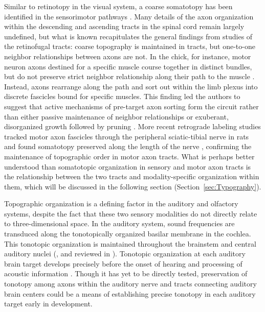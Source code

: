Similar to retinotopy in the visual system, a coarse somatotopy has been identified in the sensorimotor pathways \cite{barnard1956study,maslany1991somatotopic,milner1998selective}.
Many details of the axon organization within the descending and ascending tracts in the spinal cord remain largely undefined, but what is known recapitulates the general findings from studies of the retinofugal tracts: coarse topography is maintained in tracts, but one-to-one neighbor relationships between axons are not.
In the chick, for instance, motor neuron axons destined for a specific muscle course together in distinct bundles, but do not preserve strict neighbor relationship along their path to the muscle \cite{lance1981pathway}. 
Instead, axons rearrange along the path and sort out within the limb plexus into discrete fascicles bound for specific muscles. 
This finding led the authors to suggest that active mechanisms of pre-target axon sorting form the circuit rather than either passive maintenance of neighbor relationships or exuberant, disorganized growth followed by pruning \cite{lance1981pathway}. %
More recent retrograde labeling studies tracked motor axon fascicles through the peripheral sciatic-tibial nerve in rats and found somatotopy preserved along the length of the nerve \cite{badia2010topographical}, confirming the maintenance of topographic order in motor axon tracts. 
What is perhaps better understood than somatotopic organization in sensory and motor axon tracts is the relationship between the two tracts and modality-specific organization within them, which will be discussed in the following section (Section~\ref{sec:Typography}).

Topographic organization is a defining factor in the auditory and olfactory systems, despite the fact that these two sensory modalities do not directly relate to three-dimensional space.
In the auditory system, sound frequencies are transduced along the tonotopically organized basilar membrane in the cochlea.
This tonotopic organization is maintained throughout the brainstem and central auditory nuclei (, and reviewed in ).
Tonotopic organization at each auditory brain target develops precisely before the onset of hearing and processing of acoustic information \cite{rubel2002auditory,appler2011connecting}.
Though it has yet to be directly tested, preservation of tonotopy among axons within the auditory nerve and tracts connecting auditory brain centers could be a means of establishing precise tonotopy in each auditory target early in development.

